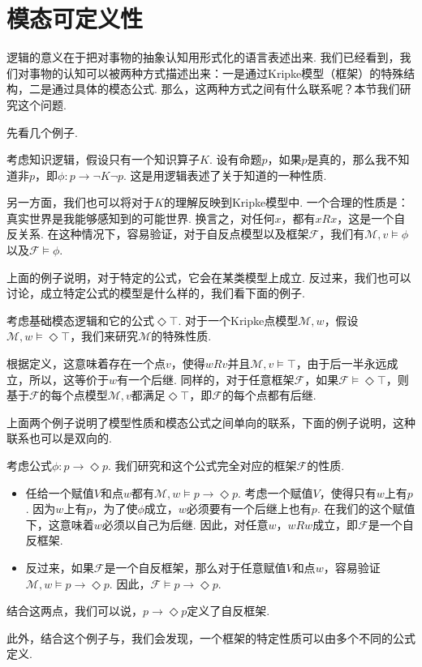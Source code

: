 \section{模态可定义性}\label{sec:modal-definability}

逻辑的意义在于把对事物的抽象认知用形式化的语言表述出来. 我们已经看到，我们对事物的认知可以被两种方式描述出来：一是通过Kripke模型（框架）的特殊结构，二是通过具体的模态公式. 那么，这两种方式之间有什么联系呢？本节我们研究这个问题. 

先看几个例子. 
\begin{example}
考虑知识逻辑，假设只有一个知识算子$K$. 设有命题$p$，如果$p$是真的，那么我不知道非$p$，即$\phi: p \to \neg K \neg p$. 这是用逻辑表述了关于知道的一种性质. 

另一方面，我们也可以将对于$K$的理解反映到Kripke模型中. 一个合理的性质是：真实世界是我能够感知到的可能世界. 换言之，对任何$x$，都有$xRx$，这是一个自反关系. 在这种情况下，容易验证，对于自反点模型以及框架$\mathcal{F}$，我们有$\mathcal{M}, v \vDash \phi$以及$\mathcal{F} \vDash \phi$. 
\end{example}

上面的例子说明，对于特定的公式，它会在某类模型上成立. 反过来，我们也可以讨论，成立特定公式的模型是什么样的，我们看下面的例子. 

\begin{example}\label{ex:box-top}
考虑基础模态逻辑和它的公式$\Diamond \top$. 对于一个Kripke点模型$\mathcal{M},w$，假设$\mathcal{M}, w \vDash \Diamond \top$，我们来研究$\mathcal{M}$的特殊性质. 

根据定义，这意味着存在一个点$v$，使得$w R v$并且$\mathcal{M}, v \vDash \top$，由于后一半永远成立，所以，这等价于$w$有一个后继. 同样的，对于任意框架$\mathcal{F}$，如果$\mathcal{F} \vDash \Diamond \top$，则基于$\mathcal{F}$的每个点模型$\mathcal{M}, v$都满足$\Diamond \top$，即$\mathcal{F}$的每个点都有后继. 
\end{example}

上面两个例子说明了模型性质和模态公式之间单向的联系，下面的例子说明，这种联系也可以是双向的. 

\begin{example}
考虑公式$\phi:p \to \Diamond p$. 我们研究和这个公式完全对应的框架$\mathcal{F}$的性质. 
\begin{itemize}
    \item 任给一个赋值$V$和点$w$都有$\mathcal{M}, w \vDash p \to \Diamond p$. 考虑一个赋值$V$，使得只有$w$上有$p$. 因为$w$上有$p$，为了使$\phi$成立，$w$必须要有一个后继上也有$p$. 在我们的这个赋值下，这意味着$w$必须以自己为后继. 因此，对任意$w$，$wRw$成立，即$\mathcal{F}$是一个自反框架. 
    \item 反过来，如果$\mathcal{F}$是一个自反框架，那么对于任意赋值$V$和点$w$，容易验证$\mathcal{M}, w \vDash p \to \Diamond p$. 因此，$\mathcal{F} \vDash p \to \Diamond p$. 
\end{itemize}
结合这两点，我们可以说，$p\to \Diamond p$定义了自反框架. 

此外，结合这个例子与，我们会发现，一个框架的特定性质可以由多个不同的公式定义. 
\end{example}

